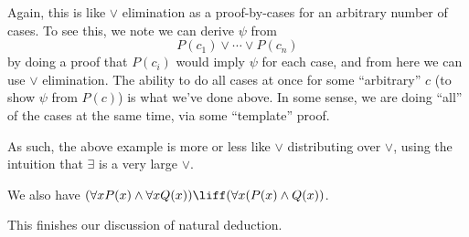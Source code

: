 \documentclass[../notes.tex]{subfiles}
\begin{document}
\begin{remark}
	Again, this is like $\lor$ elimination as a proof-by-cases for an arbitrary number of cases. To see this, we note we can derive $\psi$ from
	\[P(c_1)\lor\cdots\lor P(c_n)\]
	by doing a proof that $P(c_i)$ would imply $\psi$ for each case, and from here we can use $\lor$ elimination. The ability to do all cases at once for some ``arbitrary'' $c$ (to show $\psi$ from $P(c)$) is what we've done above. In some sense, we are doing ``all'' of the cases at the same time, via some ``template'' proof.
\end{remark}
\begin{remark}
	As such, the above example is more or less like $\lor$ distributing over $\lor$, using the intuition that $\exists$ is a very large $\lor$.
\end{remark}
\begin{remark}
	We also have $(\forall xP(x)\land\forall xQ(x))\liff(\forall x(P(x)\land Q(x))$.
\end{remark}
This finishes our discussion of natural deduction.
\end{document}
